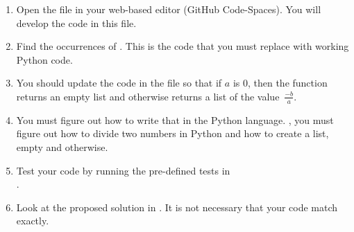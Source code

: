 \begin{enumerate}

\item Open the file  in your web-based editor (GitHub Code-Spaces).
  You will develop the code in this file.

\item Find the occurrences of .
  This is the code that you must replace with working Python code.

\item You should update the code in the file  so that if
$a$ is 0, then the function returns an empty list and otherwise
  returns a list of the value~$\frac{-b}{a}$.

\item You must figure out how
to write that in the Python language.  \Ie, you must figure out how to
divide two numbers in Python and how to create a list, empty and
otherwise.


\item Test your code by running the pre-defined tests in \\
  .

\item Look at the proposed solution in .  It
  is not necessary that your code match exactly.

\end{enumerate}

